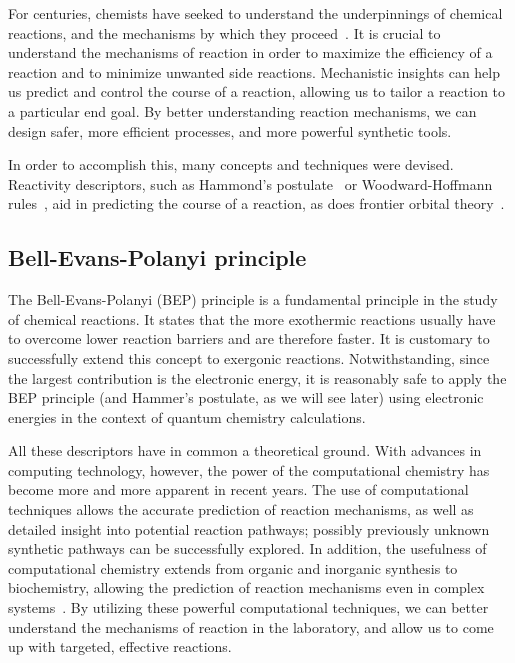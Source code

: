 
For centuries,
chemists have seeked to understand the underpinnings of chemical reactions,
and the mechanisms by which they proceed~\cite{Armstrong_1887}.
It is crucial to understand the mechanisms of reaction in order to maximize the efficiency of a reaction
and to minimize unwanted side reactions.
Mechanistic insights can help us predict and control the course of a reaction,
allowing us to tailor a reaction to a particular end goal.
By better understanding reaction mechanisms,
we can design safer,
more efficient processes,
and more powerful synthetic tools.

In order to accomplish this,
many concepts and techniques were devised.
Reactivity descriptors,
such as
Hammond's postulate~\cite{Hammond_1955,Cremer_2012,HammondPrinciple} or
Woodward-Hoffmann rules~\cite{Havinga_1961,Woodward_1965,Dewar_1966,Zimmerman_1966,Woodward_1969,Nobel_1981},
aid in predicting the course of a reaction,
as does frontier orbital theory~\cite{Fukui_1952,Brown_2013}.

\subsection{Bell-Evans-Polanyi principle}
The Bell-Evans-Polanyi (BEP) principle is a fundamental principle in the study
of chemical reactions.
It states that the more exothermic reactions usually have to overcome lower
reaction barriers and are therefore faster.
It is customary to successfully extend this concept to exergonic reactions.
Notwithstanding,
since the largest contribution is the electronic energy,
it is reasonably
safe to apply the BEP principle (and Hammer's postulate,
as we will see later)
using electronic energies in the context of quantum chemistry calculations.

All these descriptors have in common a theoretical ground.
With advances in computing technology,
however,
the power of the computational chemistry has become more and more apparent in recent years.
The use of computational techniques allows the accurate prediction of reaction mechanisms,
as well as detailed insight into potential reaction pathways;
possibly previously unknown synthetic pathways can be successfully explored.
In addition,
the usefulness of computational chemistry extends from organic and inorganic synthesis to biochemistry,
allowing the prediction of reaction mechanisms even in complex systems~\cite{Klippenstein_2014}.
By utilizing these powerful computational techniques,
we can better understand the mechanisms of reaction in the laboratory,
and allow us to come up with targeted,
effective reactions.

